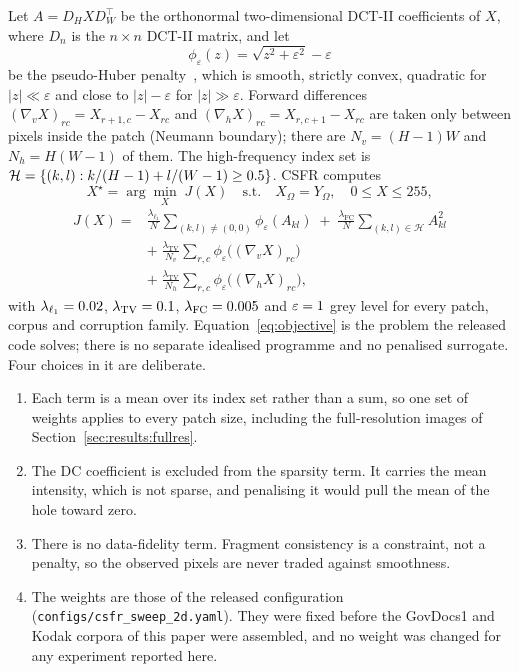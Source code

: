\documentclass[final,3p]{elsarticle}
\begin{document}
Let $A = D_{H} X D_{W}^{\top}$ be the orthonormal two-dimensional DCT-II coefficients of $X$, where $D_{n}$ is the $n \times n$ DCT-II matrix, and let
\begin{equation}
\phi_{\varepsilon}(z) = \sqrt{z^{2} + \varepsilon^{2}} - \varepsilon
\end{equation}
be the pseudo-Huber penalty~\cite{charbonnier1997deterministic}, which is smooth, strictly convex, quadratic for $|z| \ll \varepsilon$ and close to $|z| - \varepsilon$ for $|z| \gg \varepsilon$. Forward differences $(\nabla_{v} X)_{rc} = X_{r+1,c} - X_{rc}$ and $(\nabla_{h} X)_{rc} = X_{r,c+1} - X_{rc}$ are taken only between pixels inside the patch (Neumann boundary); there are $N_{v} = (H-1)W$ and $N_{h} = H(W-1)$ of them. The high-frequency index set is $\mathcal{H} = \{(k,l) : k/(H-1) + l/(W-1) \ge 0.5\}$. CSFR computes
\begin{equation}
\label{eq:objective}
X^{\star} = \arg\min_{X}\; J(X) \quad \text{s.t.} \quad X_{\Omega} = Y_{\Omega}, \quad 0 \le X \le 255,
\end{equation}
\begin{equation}
\label{eq:J}
\begin{aligned}
J(X) = {} & \frac{\lambda_{\ell_1}}{N} \sum_{(k,l) \neq (0,0)} \phi_{\varepsilon}(A_{kl})
\;+\; \frac{\lambda_{\mathrm{FC}}}{N} \sum_{(k,l) \in \mathcal{H}} A_{kl}^{2} \\
& +\; \frac{\lambda_{\mathrm{TV}}}{N_{v}} \sum_{r,c} \phi_{\varepsilon}\bigl((\nabla_{v} X)_{rc}\bigr) \\
& +\; \frac{\lambda_{\mathrm{TV}}}{N_{h}} \sum_{r,c} \phi_{\varepsilon}\bigl((\nabla_{h} X)_{rc}\bigr),
\end{aligned}
\end{equation}
with $\lambda_{\ell_1} = 0.02$, $\lambda_{\mathrm{TV}} = 0.1$, $\lambda_{\mathrm{FC}} = 0.005$ and $\varepsilon = 1$ grey level for every patch, corpus and corruption family. Equation~\eqref{eq:objective} is the problem the released code solves; there is no separate idealised programme and no penalised surrogate. Four choices in it are deliberate.
\begin{enumerate}
  \item Each term is a mean over its index set rather than a sum, so one set of weights applies to every patch size, including the full-resolution images of Section~\ref{sec:results:fullres}.
  \item The DC coefficient is excluded from the sparsity term. It carries the mean intensity, which is not sparse, and penalising it would pull the mean of the hole toward zero.
  \item There is no data-fidelity term. Fragment consistency is a constraint, not a penalty, so the observed pixels are never traded against smoothness.
  \item The weights are those of the released configuration (\texttt{configs/\allowbreak csfr\allowbreak\_sweep\allowbreak\_2d.yaml}). They were fixed before the GovDocs1 and Kodak corpora of this paper were assembled, and no weight was changed for any experiment reported here.
\end{enumerate}
\end{document}
